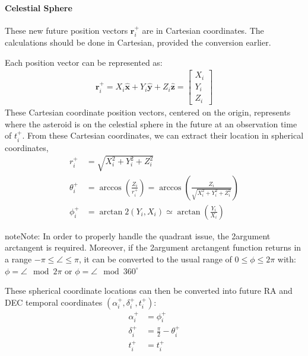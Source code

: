 \documentclass[letterpaper,11pt,english]{sphinxmanual}
\begin{document}
\paragraph{Celestial Sphere}
\label{\detokenize{technical/algorithms/spherical_kinematics:celestial-sphere}}
\sphinxAtStartPar
These new future position vectors \(\mathbf{r}^+_i\) are in Cartesian
coordinates. The calculations should be done in Cartesian, provided the
conversion earlier.

\sphinxAtStartPar
Each position vector can be represented as:
\begin{equation*}
\begin{split}\mathbf{r}^+_i = X_i \mathbf{\hat x} + Y_i \mathbf{\hat y} + Z_i \mathbf{\hat z} = \begin{bmatrix} X_i \\ Y_i \\ Z_i \end{bmatrix}\end{split}
\end{equation*}
\sphinxAtStartPar
These Cartesian coordinate position vectors, centered on the origin, represents
where the asteroid is on the celestial sphere in the future at an observation
time of \(t^+_i\). From these Cartesian coordinates, we can extract their
location in spherical coordinates,
\begin{equation*}
\begin{split}r^+_i &= \sqrt{X_i^2 + Y_i^2 + Z_i^2} \\
\theta^+_i &= \arccos\left(\frac{Z_i}{r^+_i}\right) = \arccos\left(\frac{Z_i}{\sqrt{X_i^2 + Y_i^2 + Z_i^2}}\right) \\
\phi^+_i &= \arctan\!2(Y_i, X_i) \simeq \arctan\left(\frac{Y_i}{X_i}\right)\end{split}
\end{equation*}
\begin{sphinxadmonition}{note}{Note:}
\sphinxAtStartPar
In order to properly handle the quadrant issue, the 2\sphinxhyphen{}argument arctangent is
required. Moreover, if the 2\sphinxhyphen{}argument arctangent function returns in a range
\(-\pi \leq \angle \leq \pi\), it can be converted to the usual range of
\(0 \leq \phi \leq 2\pi\) with: \(\phi = \angle \mod 2\pi\)
or \(\phi = \angle \mod 360^\circ\)
\end{sphinxadmonition}

\sphinxAtStartPar
These spherical coordinate locations can then be converted into future RA and
DEC temporal coordinates \((\alpha^+_i, \delta^+_i, t^+_i)\):
\begin{equation*}
\begin{split}\alpha^+_i &= \phi^+_i \\
\delta^+_i &= \frac{\pi}{2} - \theta^+_i \\
t^+_i &= t^+_i\end{split}
\end{equation*}
\end{document}
